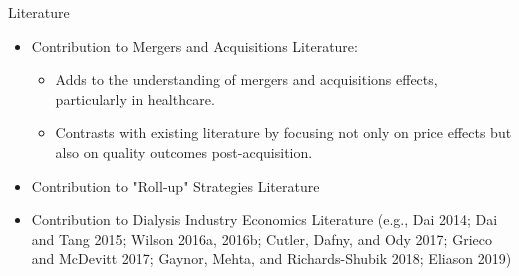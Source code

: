 \begin{frame}{Literature}

\begin{itemize}
    \item Contribution to Mergers and Acquisitions Literature:
    \begin{itemize}
    \item Adds to the understanding of mergers and acquisitions effects, particularly in healthcare.
    \item Contrasts with existing literature by focusing not only on price effects but also on quality outcomes post-acquisition.
   \end{itemize}

    \item Contribution to "Roll-up" Strategies Literature

    \item Contribution to Dialysis Industry Economics Literature (e.g., Dai 2014; Dai and Tang 2015; Wilson 2016a, 2016b; Cutler, Dafny, and Ody 2017; Grieco and McDevitt 2017; Gaynor, Mehta, and Richards-Shubik 2018; Eliason 2019)
\end{itemize}

\end{frame}